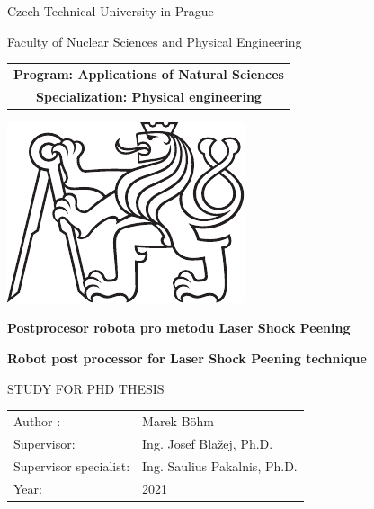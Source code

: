 \documentclass[a4paper,twoside,12pt]{book}
\newcommand{\tb}{\textbf} %
\newcommand{\cvut}{Czech Technical University in Prague}
\newcommand{\fjfi}{Faculty of Nuclear Sciences and Physical Engineering }
\newcommand{\program}{Applications of Natural Sciences}
\newcommand{\obor}{Physical engineering} %
\newcommand{\druh}{Study for PhD thesis} %
\newcommand{\logoCVUT}{\includegraphics{img/symbol_cvut.pdf}} %
\newcommand{\nazevcz}{Postprocesor robota pro metodu Laser Shock Peening}    %
\newcommand{\nazeven}{Robot post processor for Laser Shock Peening technique}          %
\newcommand{\autor}{Marek Böhm}   %
\newcommand{\vedouci}{Ing. Josef Blažej, Ph.D.} %
\newcommand{\specialist}{Ing. Saulius Pakalnis, Ph.D.} %
\newcommand{\rok}{2021}  %
\begin{document}
\frontmatter
\thispagestyle{empty}

\begin{center}
	{\LARGE
		\cvut\par
		\fjfi
	}
    \vspace{10mm}

    \begin{tabular}{c}
		\tb{Program: \program}  \\[3pt]   
		\tb{Specialization: \obor}\\
    \end{tabular}

   \vspace{10mm} \logoCVUT \vspace{15mm} 

   {\huge \tb{\nazevcz}\par}
   \vspace{5mm}   
   {\huge \tb{\nazeven}\par}
   
   \vspace{15mm}
   {\Large \MakeUppercase{\druh}}

   \vfill
   {\large
    \begin{tabular}{ll}
    Author : & \autor\\
    Supervisor: & \vedouci\\
    Supervisor specialist: & \specialist\\
    Year: & \rok
    \end{tabular}
   }
\end{center}

\clearpage{\pagestyle{empty}\cleardoublepage} %



\newpage  %
\thispagestyle{empty} %

%
%
%
\end{document}
